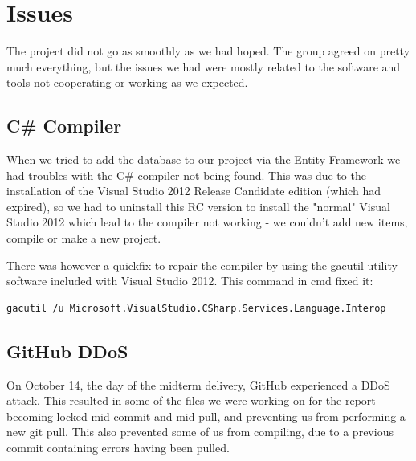 \section{Issues}
The project did not go as smoothly as we had hoped. The group agreed on pretty much everything, but the issues we had were mostly related to the software and tools not cooperating or working as we expected.

\subsection{C\# Compiler}
When we tried to add the database to our project via the Entity Framework we had troubles with the C\# compiler not being found. This was due to the installation of the Visual Studio 2012 Release Candidate edition (which had expired), so we had to uninstall this RC version to install the "normal" Visual Studio 2012 which lead to the compiler not working - we couldn't add new items, compile or make a new project.

There was however a quickfix to repair the compiler by using the gacutil utility software included with Visual Studio 2012.
This command in cmd fixed it:
\begin{verbatim}
gacutil /u Microsoft.VisualStudio.CSharp.Services.Language.Interop 
\end{verbatim}

\subsection{GitHub DDoS}
On October 14, the day of the midterm delivery, GitHub experienced a DDoS attack. This resulted in some of the files we were working on for the report becoming locked mid-commit and mid-pull, and preventing us from performing a new git pull. This also prevented some of us from compiling, due to a previous commit containing errors having been pulled.


